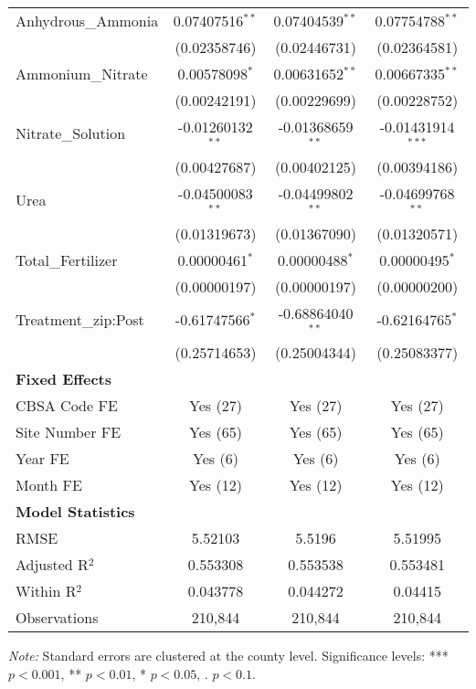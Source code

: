 \documentclass[12pt]{article}
\begin{document}
\begin{table}[H]
\begin{threeparttable}
\begin{adjustbox}{max width=\textwidth}
\begin{tabular}{l c c c}
					Anhydrous\_Ammonia & 0.07407516$^{**}$ & 0.07404539$^{**}$ & 0.07754788$^{**}$ \\  
					& {\footnotesize (0.02358746)} & {\footnotesize (0.02446731)} & {\footnotesize (0.02364581)} \\
					Ammonium\_Nitrate & 0.00578098$^{*}$ & 0.00631652$^{**}$ & 0.00667335$^{**}$ \\  
					& {\footnotesize (0.00242191)} & {\footnotesize (0.00229699)} & {\footnotesize (0.00228752)} \\
					Nitrate\_Solution & -0.01260132$^{**}$ & -0.01368659$^{**}$ & -0.01431914$^{***}$ \\  
					& {\footnotesize (0.00427687)} & {\footnotesize (0.00402125)} & {\footnotesize (0.00394186)} \\
					Urea & -0.04500083$^{**}$ & -0.04499802$^{**}$ & -0.04699768$^{**}$ \\  
					& {\footnotesize (0.01319673)} & {\footnotesize (0.01367090)} & {\footnotesize (0.01320571)} \\
					Total\_Fertilizer & 0.00000461$^{*}$ & 0.00000488$^{*}$ & 0.00000495$^{*}$ \\ 
					& {\footnotesize (0.00000197)} & {\footnotesize (0.00000197)} & {\footnotesize (0.00000200)} \\
					Treatment\_zip:Post & -0.61747566$^{*}$ & -0.68864040$^{**}$ & -0.62164765$^{*}$ \\
					& {\footnotesize (0.25714653)} & {\footnotesize (0.25004344)} & {\footnotesize (0.25083377)} \\
					\midrule
					\textbf{Fixed Effects} & & & \\
					CBSA Code FE & Yes (27) & Yes (27) & Yes (27) \\
					Site Number FE & Yes (65) & Yes (65) & Yes (65) \\
					Year FE & Yes (6) & Yes (6) & Yes (6) \\
					Month FE & Yes (12) & Yes (12) & Yes (12) \\
					\midrule
					\textbf{Model Statistics} & & & \\
					RMSE & 5.52103 & 5.5196 & 5.51995 \\
					Adjusted R$^2$ & 0.553308 & 0.553538 & 0.553481 \\
					Within R$^2$ & 0.043778 & 0.044272 & 0.04415 \\
					Observations & 210,844 & 210,844 & 210,844 \\
					\bottomrule
				\end{tabular}
			\end{adjustbox}
			\begin{tablenotes}
				\item \textit{Note:} Standard errors are clustered at the county level. Significance levels: *** $p<0.001$, ** $p<0.01$, * $p<0.05$, . $p<0.1$. 
			\end{tablenotes}
		\end{threeparttable}
	\end{table}
	
\end{document}
